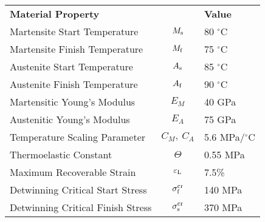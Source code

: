 \documentclass[border=1mm,
               class=article
               preview]{standalone}
\begin{document}
\renewcommand{\arraystretch}{1.5}
 {
\begin{tabular}{lcl}
   \rowcolor{black} \textbf{\color{white} Material Property} & & \textbf{\color{white} Value}\\
   Martensite Start Temperature & $M_\mathrm{s}$       & 80 $^\circ$C\\
   Martensite Finish Temperature & $M_\mathrm{f}$       & 75 $^\circ$C\\
   Austenite Start Temperature & $A_\mathrm{s}$       & 85 $^\circ$C\\
   Austenite Finish Temperature & $A_\mathrm{f}$       & 90 $^\circ$C\\
   Martensitic Young's Modulus & $E_M$       & 40 GPa\\
   Austenitic Young's Modulus & $E_A$       & 75 GPa\\
   Temperature Scaling Parameter & $C_M,~C_A$ & 5.6 MPa/$^\circ$C\\
   Thermoelastic Constant & $\Theta$ & 0.55 MPa\\
   Maximum Recoverable Strain & $\varepsilon_\mathrm{L}$ & 7.5\% \\
   Detwinning Critical Start Stress & $\sigma_\mathrm{f}^\mathrm{cr}$ & 140 MPa\\
   Detwinning Critical Finish Stress & $\sigma_\mathrm{s}^\mathrm{cr}$ & 370 MPa\\
\end{tabular}}
\renewcommand{\arraystretch}{1}
\end{document}
